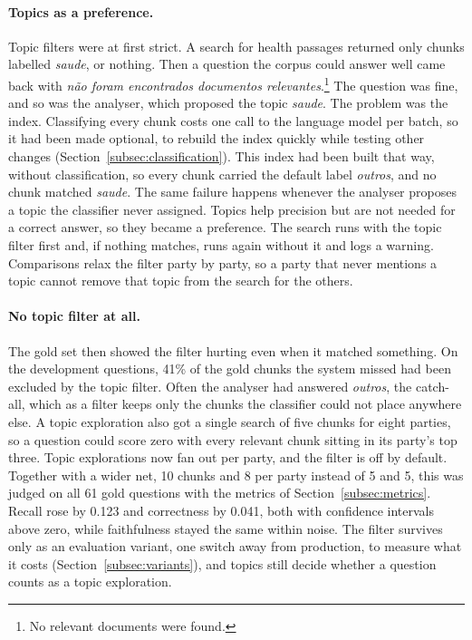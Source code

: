 \paragraph{Topics as a preference.} Topic filters were at first strict. A
search for health passages returned only chunks labelled \textit{saude}, or
nothing. Then a question the corpus could answer well came back with
\textit{não foram encontrados documentos relevantes}.\footnote{No relevant
documents were found.} The question was fine, and so was the analyser, which
proposed the topic \textit{saude}. The problem was the index. Classifying
every chunk costs one call to the language model per batch, so it had been
made optional, to rebuild the index quickly while testing other changes
(Section~\ref{subsec:classification}). This index had been built that way,
without classification, so every chunk carried the default label
\textit{outros}, and no chunk matched \textit{saude}. The same failure happens whenever the
analyser proposes a topic the classifier never assigned. Topics help precision
but are not needed for a correct answer, so they became a preference. The
search runs with the topic filter first and, if nothing matches, runs again
without it and logs a warning. Comparisons relax the filter party by party, so
a party that never mentions a topic cannot remove that topic from the search
for the others.

\paragraph{No topic filter at all.} The gold set then showed the filter hurting
even when it matched something. On the development questions, 41\% of the
gold chunks the system missed had been excluded by the topic filter. Often the
analyser had answered \textit{outros}, the catch-all, which as a filter keeps
only the chunks the classifier could not place anywhere else. A topic
exploration also got a single search of five chunks for eight parties, so a
question could score zero with every relevant chunk sitting in its party's top
three. Topic explorations now fan out per party, and the filter is off by
default. Together with a wider net, 10 chunks and 8 per party instead of 5 and
5, this was judged on all 61 gold questions with the metrics of
Section~\ref{subsec:metrics}. Recall rose by 0.123 and correctness by 0.041,
both with confidence intervals above zero, while faithfulness stayed the same
within noise. The filter survives only as an evaluation variant, one switch
away from production, to measure what it costs
(Section~\ref{subsec:variants}), and topics still decide whether a question
counts as a topic exploration.

